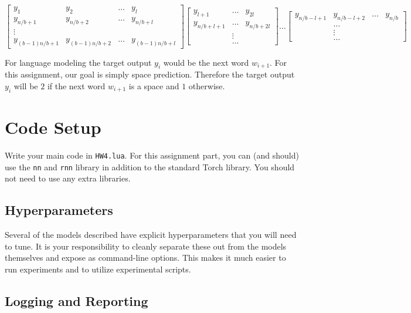 \documentclass[11pt]{article}
\begin{document}
\[
  \begin{bmatrix}
    y_1 & y_2 & \ldots & y_{l}\\
    y_{n/b+1} & y_{n/b+2} & \ldots & y_{n/b+l}\\
    \vdots \\
    y_{(b-1)n/b + 1} & y_{(b-1)n/b+2} & \ldots & y_{(b-1)n/b+l}
  \end{bmatrix}   \begin{bmatrix}
    y_{l+1} &  \ldots & y_{2l} \\
    y_{n/b+l+1} &  \ldots & y_{n/b+2l}\\
    & \vdots & \\
    & \ldots &  
  \end{bmatrix}
  \ldots
  \begin{bmatrix}
    y_{n/b-l+1} & y_{n/b-l+2} & \ldots & y_{n/b}\\
    & \ldots & \\
    & \vdots & \\
    & \ldots & 
  \end{bmatrix}
\] 

For language modeling the target output $y_i$ would be the next word
$w_{i+1}$.  For this assignment, our goal is simply space
prediction. Therefore the target output $y_i$ will be $2$ if the next
word $w_{i+1}$ is a space and $1$ otherwise.

\section{Code Setup}

Write your main code in \texttt{HW4.lua}. For this assignment part,
you can (and should) use the \texttt{nn} and \texttt{rnn} library in addition to the
standard Torch library. You should not need to use any extra libraries.

\subsection{Hyperparameters}

Several of the models described have explicit hyperparameters that you will 
need to tune. It is your responsibility to cleanly separate these out from 
the models themselves and expose as command-line options. This makes it much 
easier to run experiments and to utilize experimental scripts. 

\subsection{Logging and Reporting}
\end{document}
